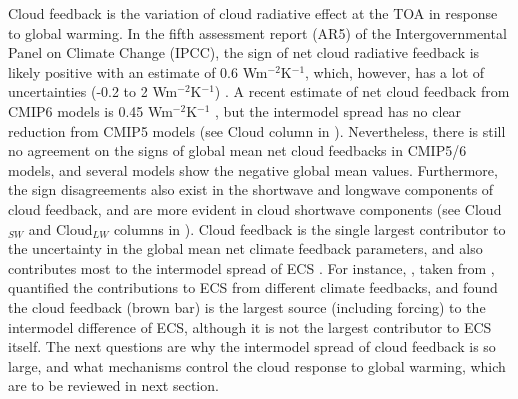 Cloud feedback is the variation of cloud radiative effect at the TOA in response to global warming. In the fifth assessment report (AR5) of the Intergovernmental Panel on Climate Change (IPCC), the sign of net cloud radiative feedback is likely positive with an estimate of 0.6 Wm$^{-2}$K$^{-1}$, which, however, has a lot of uncertainties (-0.2 to 2 Wm$^{-2}$K$^{-1}$) \citep{Stocker2013}.  A recent estimate of net cloud feedback from CMIP6 models is 0.45 Wm$^{-2}$K$^{-1}$ \citep{Zelinka2020causes,Sherwood2020}, but the intermodel spread has no clear reduction from CMIP5 models (see Cloud column in ). Nevertheless, there is still no agreement on the signs of global mean net cloud feedbacks in CMIP5/6 models, and several models show the negative global mean values. Furthermore, the sign disagreements also exist in the shortwave and longwave components of cloud feedback, and are more evident in cloud shortwave components (see Cloud$_{SW}$ and Cloud$_{LW}$ columns in ). Cloud feedback is the single largest contributor to the uncertainty in the global mean net climate feedback parameters, and also contributes most to the intermodel spread of ECS \citep{Bony2005,Soden2006,Dufresne2008assessment,Colman2011tropospheric,Vial2013,Ceppi2017,Zelinka2020causes,Sherwood2020}. For instance, , taken from \cite{Dufresne2008assessment}, quantified the contributions to ECS from different climate feedbacks, and found the cloud feedback (brown bar) is the largest source (including forcing) to the intermodel difference of ECS, although it is not the largest contributor to ECS itself. The next questions are why the intermodel spread of cloud feedback is so large, and what mechanisms control the cloud response to global warming, which are to be reviewed in next section.



